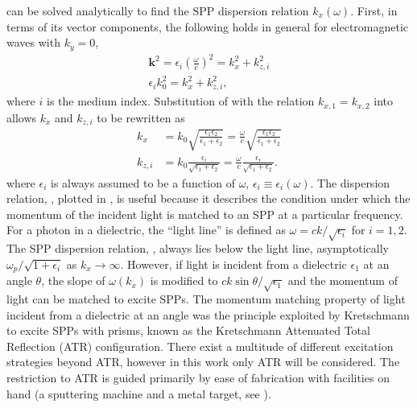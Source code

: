  can be solved analytically to find the SPP
dispersion relation $k_x(\omega)$.
First, in terms of its vector components, the following holds in general
for electromagnetic waves with $k_y=0$,
\begin{align}
  \mathbf{k}^2=\epsilon_i {\left(\frac{\omega}{c}\right)}^2=k_x^2 + k_{z,i}^2 \\
  \epsilon_i k_0^2=k_x^2 + k_{z,i}^2,
  \label{eqn:dispersion1}
\end{align}
where $i$ is the medium index.
Substitution of  with the relation
$k_{x,1}=k_{x,2}$ into  allows
$k_x$ and $k_{z,i}$ to be rewritten as
\begin{align}
  k_x     & = k_0\sqrt{\frac{\epsilon_1 \epsilon_2}{\epsilon_1+\epsilon_2}}
  = \frac{\omega}{c}\sqrt{\frac{\epsilon_1
  \epsilon_2}{\epsilon_1+\epsilon_2}} \label{eqn:kayexx}\\
  k_{z,i} & = k_0\frac{\epsilon_i}{\sqrt{\epsilon_1+\epsilon_2}}
  = \frac{\omega}{c}\frac{\epsilon_i}{\sqrt{\epsilon_1+\epsilon_2}}.
  \label{eqn:dandangus}
\end{align}
where $\epsilon_i$ is always assumed to be a function of $\omega$,
$\epsilon_i\equiv\epsilon_i(\omega)$.  The dispersion relation,
, plotted in , is
useful because it describes the condition under which the momentum of the
incident light is matched to an SPP at a particular frequency.  For a
photon in a dielectric, the ``light line'' is defined as $\omega = c k
/\sqrt{\epsilon_i}$ for $i=1,2$.  The SPP dispersion relation,
, always lies below the light line,
asymptotically $\omega_p/\sqrt{1+\epsilon_i}$ as $k_x\to\infty$.
However, if light is incident from a dielectric $\epsilon_1$ at an angle
$\theta$, the slope of $\omega(k_x)$ is modified to $c k \sin
\theta/\sqrt{\epsilon_1}$ and the momentum of light can be matched to
excite SPPs.  The momentum matching property of light incident from a
dielectric at an angle was the principle exploited by Kretschmann
\cite{kretschmann1968} to excite SPPs with prisms, known as the Kretschmann
Attenuated Total Reflection (ATR) configuration.  There exist a multitude of
different excitation strategies beyond ATR, however in this work only ATR
will be considered.  The restriction to ATR is guided primarily by ease of
fabrication with facilities on hand (a sputtering machine and a metal
target, see ).

